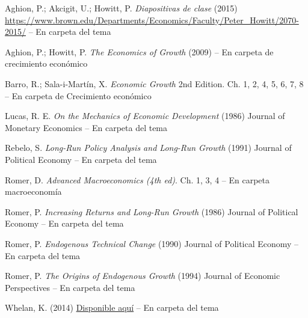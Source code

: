 \documentclass{nuevotema}
\begin{document}
Aghion, P.; Akcigit, U.; Howitt, P. \textit{Diapositivas de clase} (2015) \url{https://www.brown.edu/Departments/Economics/Faculty/Peter\_Howitt/2070-2015/} -- En carpeta del tema

Aghion, P.; Howitt, P. \textit{The Economics of Growth} (2009) -- En carpeta de crecimiento económico

Barro, R.; Sala-i-Martín, X. \textit{Economic Growth} 2nd Edition. Ch. 1, 2, 4, 5, 6, 7, 8 -- En carpeta de Crecimiento económico

Lucas, R. E. \textit{On the Mechanics of Economic Development} (1986) Journal of Monetary Economics -- En carpeta del tema

Rebelo, S. \textit{ Long-Run Policy Analysis and Long-Run Growth} (1991) Journal of Political Economy -- En carpeta del tema

Romer, D. \textit{Advanced Macroeconomics (4th ed)}. Ch. 1, 3, 4 -- En carpeta macroeconomía

Romer, P. \textit{Increasing Returns and Long-Run Growth} (1986) Journal of Political Economy --  En carpeta del tema

Romer, P. \textit{Endogenous Technical Change} (1990) Journal of Political Economy -- En carpeta del tema

Romer, P. \textit{The Origins of Endogenous Growth} (1994) Journal of Economic Perspectives -- En carpeta del tema

Whelan, K. (2014)  \href{https://www.karlwhelan.com/MAMacroSem1/Notes12.pdf}{Disponible aquí} -- En carpeta del tema
\end{document}

